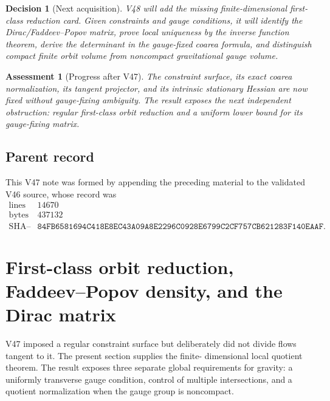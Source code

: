 \documentclass[11pt]{article}
\newtheorem{assessment}[theorem]{Assessment}
\newtheorem{decision}[theorem]{Decision}
\begin{document}
\begin{decision}[Next acquisition]
\label{dec:v11v47-next}
V48 will add the missing finite-dimensional first-class reduction
card.  Given constraints and gauge conditions, it will identify the
Dirac/Faddeev--Popov matrix, prove local uniqueness by the inverse
function theorem, derive the determinant in the gauge-fixed coarea
formula, and distinguish compact finite orbit volume from noncompact
gravitational gauge volume.
\end{decision}

\begin{assessment}[Progress after V47]
\label{ass:v11v47-status}
The constraint surface, its exact coarea normalization, its tangent
projector, and its intrinsic stationary Hessian are now fixed without
gauge-fixing ambiguity.  The result exposes the next independent
obstruction: regular first-class orbit reduction and a uniform lower
bound for its gauge-fixing matrix.
\end{assessment}

\subsection{Parent record}

This V47 note was formed by appending the preceding material to the
validated V46 source, whose record was
\[
\begin{array}{c|c}
\text{lines}&14670\\
\text{bytes}&437132\\
\text{SHA--256}&
\texttt{84FB6581694C418E8EC43A09A8E2296C0928E6799C2CF757CB621283F140EAAF}.
\end{array}                                                     \tag{47.24}
\]


\section{First-class orbit reduction, Faddeev--Popov density, and the
Dirac matrix}
\label{sec:v11v48}

V47 imposed a regular constraint surface but deliberately did not
divide flows tangent to it.  The present section supplies the finite-
dimensional local quotient theorem.  The result exposes three separate
global requirements for gravity: a uniformly transverse gauge
condition, control of multiple intersections, and a quotient
normalization when the gauge group is noncompact.
\end{document}
